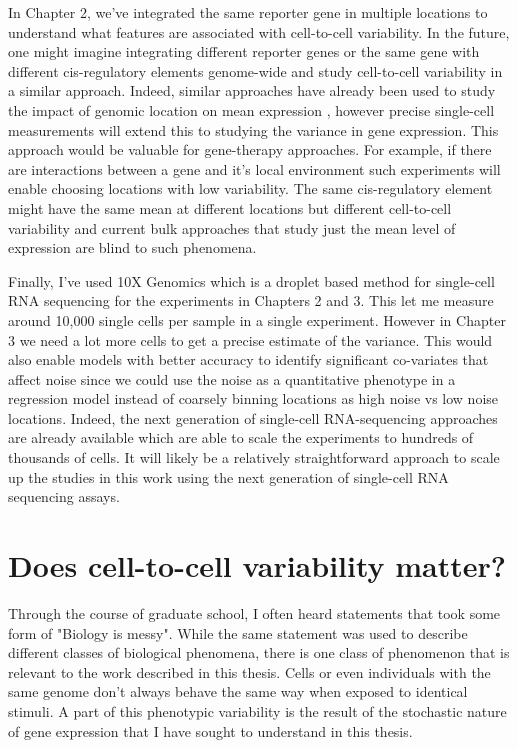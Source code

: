In Chapter 2, we've integrated the same reporter gene in multiple locations to understand what features are associated with cell-to-cell variability. In the future, one might imagine integrating different reporter genes or the same gene with different cis-regulatory elements genome-wide and study cell-to-cell variability in a similar approach. Indeed, similar approaches have already been used to study the impact of genomic location on mean expression \cite{hong2022gr}, however precise single-cell measurements will extend this to studying the variance in gene expression. This approach would be valuable for gene-therapy approaches. For example, if there are interactions between a gene and it's local environment such experiments will enable choosing locations with low variability. The same cis-regulatory element might have the same mean at different locations but different cell-to-cell variability and current bulk approaches that study just the mean level of expression are blind to such phenomena.

Finally, I've used 10X Genomics which is a droplet based method for single-cell RNA sequencing for the experiments in Chapters 2 and 3. This let me measure around 10,000 single cells per sample in a single experiment. However in Chapter 3 we need a lot more cells to get a precise estimate of the variance. This would also enable models with better accuracy to identify significant co-variates that affect noise since we could use the noise as a quantitative phenotype in a regression model instead of coarsely binning locations as high noise vs low noise locations. Indeed, the next generation of single-cell RNA-sequencing approaches are already available \cite{caoj_shendurej:ComprehensiveSinglecell2017} which are able to scale the experiments to hundreds of thousands of cells. It will likely be a relatively straightforward approach to scale up the studies in this work using the next generation of single-cell RNA sequencing assays. 

\section{Does cell-to-cell variability matter?}

Through the course of graduate school, I often heard statements that took some form of "Biology is messy". While the same statement was used to describe different classes of biological phenomena, there is one class of phenomenon that is relevant to the work described in this thesis. Cells or even individuals with the same genome don't always behave the same way when exposed to identical stimuli. A part of this phenotypic variability is the result of the stochastic nature of gene expression that I have sought to understand in this thesis.

